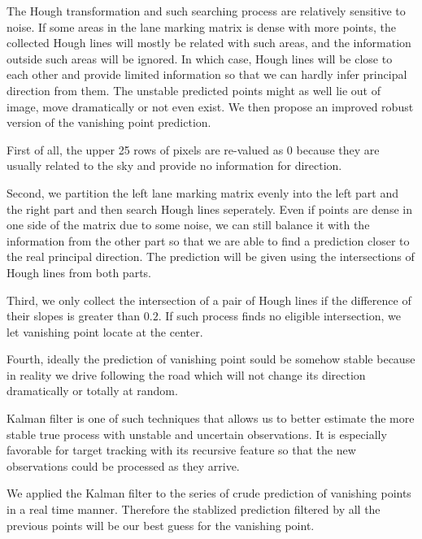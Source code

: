 \documentclass[11pt, oneside]{article}
\begin{document}
The Hough transformation and such searching process are relatively sensitive to noise. If some areas in the lane marking matrix is dense with more points, the collected Hough lines will mostly be related with such areas, and the information outside such areas will be ignored. In which case, Hough lines will be close to each other and provide limited information so that we can hardly infer principal direction from them.  The unstable predicted points might as well lie out of image, move dramatically or not even exist. We then propose an improved robust version of the vanishing point prediction.

First of all, the upper 25 rows of pixels are re-valued as $0$ because they are usually related to the sky and provide no information for direction. 

Second, we partition the left lane marking matrix evenly into the left part and the right part and then search Hough lines seperately. Even if points are dense in one side of the matrix due to some noise, we can still balance it with the information from the other part so that we are able to find a prediction closer to the real principal direction. The prediction will be given using the intersections of Hough lines from both parts. 

Third, we only collect the intersection of a pair of Hough lines if the difference of their slopes is greater than $0.2$. If such process finds no eligible intersection, we let vanishing point locate at the center. 

Fourth, ideally the prediction of vanishing point sould be somehow stable because in reality we drive following the road which will not change its direction dramatically or totally at random. 

Kalman filter is one of such techniques that allows us to better estimate the more stable true process with unstable and uncertain observations. It is especially favorable for target tracking with its recursive feature so that the new observations could be processed as they arrive. 

We applied the Kalman filter to the series of crude prediction of vanishing points in a real time manner. Therefore the stablized prediction filtered by all the previous points will be our best guess for the vanishing point. 
\end{document}
